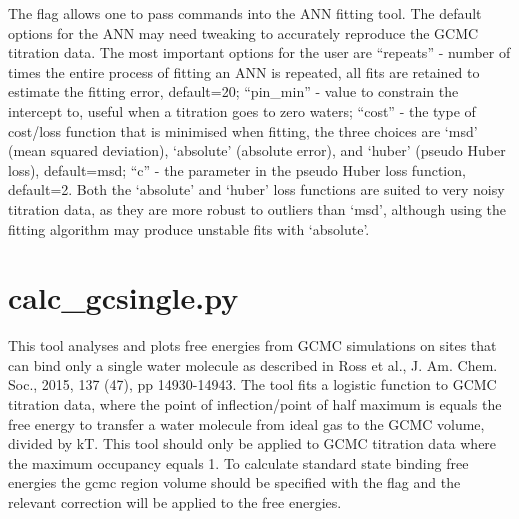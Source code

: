 \documentclass[letterpaper,10pt,english]{sphinxmanual}
\begin{document}
The flag  allows one to pass commands into the ANN fitting tool. The default options for the ANN may need tweaking to accurately reproduce the GCMC titration data. The most important options for the user are “repeats” - number of times the entire process of fitting an ANN is repeated, all fits are retained to estimate the fitting error, default=20; “pin\_min” - value to constrain the intercept to, useful when a titration goes to zero waters; “cost” - the type of cost/loss function that is minimised when fitting, the three choices are ‘msd’ (mean squared deviation), ‘absolute’ (absolute error), and ‘huber’ (pseudo Huber loss), default=msd; “c” - the parameter in the pseudo Huber loss function, default=2. Both the ‘absolute’ and ‘huber’ loss functions are suited to very noisy titration data, as they are more robust to outliers than ‘msd’, although using  the fitting algorithm may produce unstable fits with ‘absolute’.


\section{calc\_gcsingle.py}
\label{\detokenize{tools:calc-gcsingle-py}}

%
\begin{sphinxVerbatim}[commandchars=\\\{\}]
   
     
   
\end{sphinxVerbatim}


This tool analyses and plots free energies from GCMC simulations on sites that can bind only a single water molecule as described in Ross et al., J. Am. Chem. Soc., 2015, 137 (47), pp 14930-14943. The tool fits a logistic function to GCMC titration data, where the point of inflection/point of half maximum is equals the free energy to transfer a water molecule from ideal gas to the GCMC volume, divided by kT. This tool should only be applied to GCMC titration data where the maximum occupancy equals 1. To calculate standard state binding free energies the gcmc region volume should be specified with the  flag and the relevant correction will be applied to the free energies.
\end{document}
